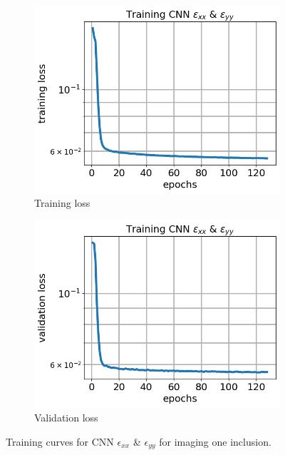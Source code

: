 \documentclass[12pt]{article}
\newcommand{\nhgfigheight}{4.0cm}
\begin{document}
\begin{figure}[h]
  \centering
  \begin{subfigure}[b]{0.45\linewidth}
    \includegraphics[totalheight=\nhgfigheight]{Figures/final1/training/exxeyy/field_strainxxyy_plot_loss.png}
    \caption{Training loss}
  \end{subfigure}
  \begin{subfigure}[b]{0.45\linewidth}
    \includegraphics[totalheight=\nhgfigheight]{Figures/final1/training/exxeyy/field_strainxxyy_plot_val_loss.png}
    \caption{Validation loss}
  \end{subfigure}
\caption{\label{fig:oneinc:trainexxeyy} Training curves for CNN $\epsilon_{xx}$ \& $\epsilon_{yy}$ for imaging one inclusion.}
\end{figure}
\end{document}
